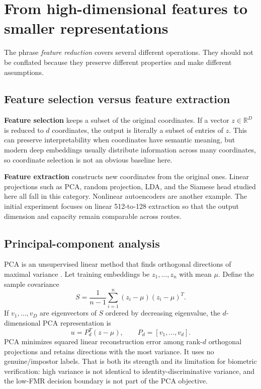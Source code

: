 \documentclass[10pt,a4paper]{article}
\begin{document}
\section{From high-dimensional features to smaller representations}\label{sec:reduction}

The phrase \emph{feature reduction} covers several different operations. They should not be
conflated because they preserve different properties and make different assumptions.

\subsection{Feature selection versus feature extraction}

\textbf{Feature selection} keeps a subset of the original coordinates. If a vector
$z\in\mathbb{R}^{D}$ is reduced to $d$ coordinates, the output is literally a subset of
entries of $z$. This can preserve interpretability when coordinates have semantic meaning,
but modern deep embeddings usually distribute information across many coordinates, so
coordinate selection is not an obvious baseline here.

\textbf{Feature extraction} constructs new coordinates from the original ones. Linear
projections such as PCA, random projection, LDA, and the Siamese head studied here all fall
in this category. Nonlinear autoencoders are another example. The initial experiment
focuses on linear 512-to-128 extraction so that the output dimension and capacity remain
comparable across routes.

\subsection{Principal-component analysis}

PCA is an unsupervised linear method that finds orthogonal directions of maximal variance
\cite{jolliffe2016}. Let training embeddings be $z_1,\ldots,z_n$ with mean $\mu$. Define the
sample covariance
\begin{equation}
S=\frac{1}{n-1}\sum_{i=1}^{n}(z_i-\mu)(z_i-\mu)^T.
\end{equation}
If $v_1,\ldots,v_D$ are eigenvectors of $S$ ordered by decreasing eigenvalue, the
$d$-dimensional PCA representation is
\begin{equation}
u=P_d^T(z-\mu),\qquad P_d=[v_1,\ldots,v_d].
\end{equation}
PCA minimizes squared linear reconstruction error among rank-$d$ orthogonal projections and
retains directions with the most variance. It uses no genuine/impostor labels. That is both
its strength and its limitation for biometric verification: high variance is not identical
to identity-discriminative variance, and the low-FMR decision boundary is not part of the
PCA objective.
\end{document}
